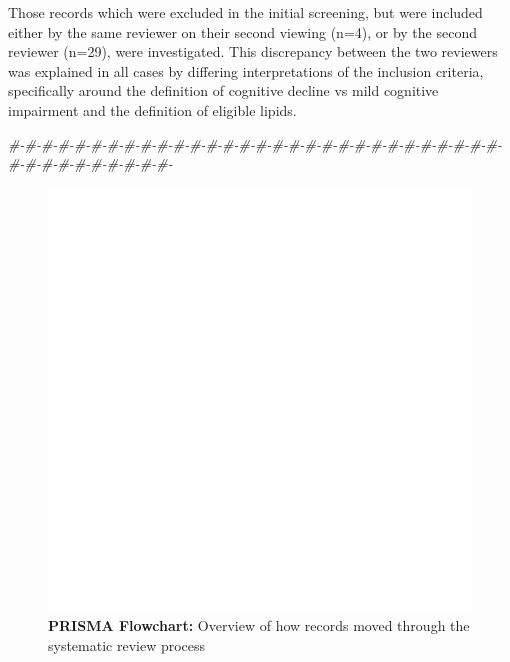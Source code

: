 \documentclass[a4paper, twoside]{templates/ociamthesis}
\newenvironment{Shaded}{\begin{snugshade}}{\end{snugshade}}
\newcommand{\CommentTok}[1]{\textcolor[rgb]{0.56,0.35,0.01}{\textit{#1}}}
\renewenvironment{Shaded}
{
  \vspace{4pt}%
  \begin{snugshade}%
}{%
  \end{snugshade}%
  \vspace{4pt}%
}
\begin{document}
Those records which were excluded in the initial screening, but were included either by the same reviewer on their second viewing (n=4), or by the second reviewer (n=29), were investigated. This discrepancy between the two reviewers was explained in all cases by differing interpretations of the inclusion criteria, specifically around the definition of cognitive decline vs mild cognitive impairment and the definition of eligible lipids.

\begin{Shaded}
\begin{Highlighting}[]
\CommentTok{\#{-}\#{-}\#{-}\#{-}\#{-}\#{-}\#{-}\#{-}\#{-}\#{-}\#{-}\#{-}\#{-}\#{-}\#{-}\#{-}\#{-}\#{-}\#{-}\#{-}\#{-}\#{-}\#{-}\#{-}\#{-}\#{-}\#{-}\#{-}\#{-}\#{-}\#{-}\#{-}\#{-}\#{-}\#{-}\#{-}\#{-}\#{-}\#{-}\#{-}}
\end{Highlighting}
\end{Shaded}





\begin{figure}
\includegraphics[width=1\linewidth]{figures/sys-rev/prismaflow} \caption[PRISMA Flowchart]{\textbf{PRISMA Flowchart:} Overview of how records moved through the systematic review process}\label{fig:prisma-flow-fig}
\end{figure}
\end{document}
